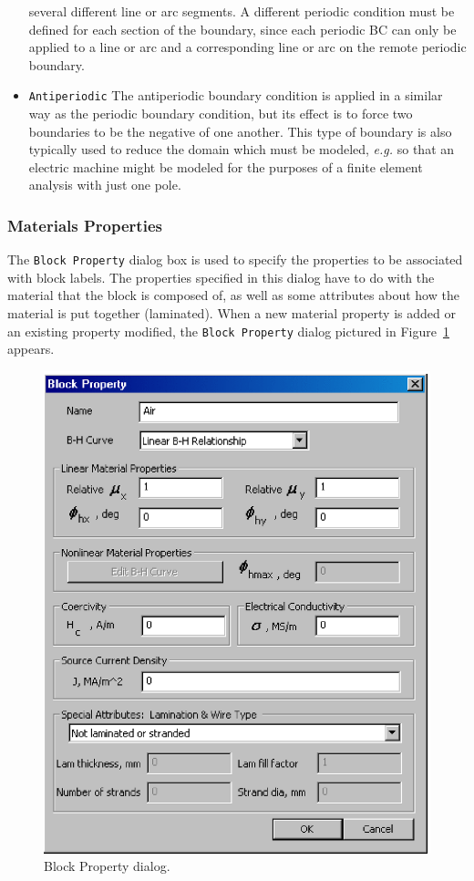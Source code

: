 \documentclass[12pt]{report}
\begin{document}
\begin{itemize}
several different line or arc segments.  A different periodic
condition must be defined for each section of the boundary, since
each periodic BC can only be applied to a line or arc and a
corresponding line or arc on the remote periodic boundary.
\item{\tt Antiperiodic}
The antiperiodic boundary condition is applied in a similar way as
the periodic boundary condition, but its effect is to force two
boundaries to be the negative of one another.  This type of
boundary is also typically used to reduce the domain which must be
modeled, {\em e.g.} so that an electric machine might be modeled
for the purposes of a finite element analysis with just one pole.
\end{itemize}

\subsubsection{Materials Properties}
The {\tt Block Property} dialog box is used to specify the
properties to be associated with block labels.  The properties
specified in this dialog have to do with the material that the
block is composed of, as well as some attributes about how the
material is put together (laminated). When a new material property
is added or an existing property modified, the {\tt Block Property}
dialog pictured in Figure~\ref{blockpropdlg} appears.
\begin{figure}
\centerline{\includegraphics{blockprop.ps}}
\caption{Block Property dialog.}
\label{blockpropdlg}
\end{figure}
\end{document}
